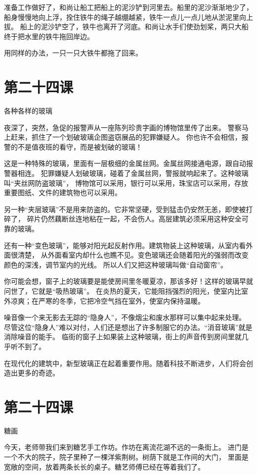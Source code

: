 \documentclass[12pt,UTF8]{ctexbook}
\begin{document}
准备工作做好了，和尚让船工把船上的泥沙铲到河里去。船里的泥沙渐渐地少了，
船身慢慢地向上浮，拴住铁牛的绳子越绷越紧，铁牛一点儿一点儿地从淤泥里向上拔。
船上的泥沙铲空了，铁牛也离开了河底。和尚让水手们使劲划桨，两只大船终于把水里的铁牛拖回岸边。

用同样的办法，一只一只大铁牛都拖了回来。

\section{第二十四课}

各种各样的玻璃

夜深了，突然，急促的报警声从一座陈列珍贵字画的博物馆里传了出来。
警察马上赶来，抓住了一个划破玻璃企图盗窃展品的犯罪嫌疑人。
你也许不会相信，报警的不是值夜班的看守，而是被划破的玻璃！

这是一种特殊的玻璃，里面有一层极细的金属丝网。金属丝网接通电源，跟自动报警器相连。
犯罪嫌疑人划破玻璃，碰着了金属丝网，警报就响起来了。这种玻璃叫“夹丝网防盗玻璃”，
博物馆可以采用，银行可以采用，珠宝店可以采用，存放重要图纸、文件的建筑物也可以采用。

另一种“夹层玻璃”不是用来防盗的。它非常坚硬，受到猛击仍安然无恙，即使被打碎了，
碎片仍然藕断丝连地粘在一起，不会伤人。高层建筑必须采用这种安全可靠的玻璃。

还有一种“变色玻璃”，能够对阳光起反射作用。建筑物装上这种玻璃，从室内看外面很清楚，
从外面看室内却什么也瞧不见。变色玻璃还会随着阳光的强弱而改变颜色的深浅，调节室内的光线。
所以人们又把这种玻璃叫做“自动窗帘”。

你可能会想，窗子上的玻璃要是能使房间里冬暖夏凉，那该多好！这样的玻璃早就问世了，它就是“吸热玻璃”。
在炎热的夏天，它能阻挡强烈的阳光，使室内比室外凉爽；在严寒的冬季，它把冷空气挡在室外，使室内保持温暖。

噪音像一个来无影去无踪的“隐身人”，不像烟尘和废水那样可以集中起来处理。
尽管这位“隐身人”难以对付，人们还是想出了许多制服它的办法。“消音玻璃”就是消除噪音的能手。
临街的窗子上如果装上这种玻璃，街上的声音传到房间里就几乎听不到了。

在现代化的建筑中，新型玻璃正在起着重要作用。随着科技不断进步，人们将会创造出更多的奇迹。

\section{第二十四课}

糖画

今天，老师带我们来到糖艺手工作坊。作坊在离流花湖不远的一条街上。
进门是一个不大的院子，院子里种了一棵洋紫荆树。树荫下就是工作间的大门，
里面是宽敞的空间，放着两条长长的桌子。糖艺师傅已经在等着我们了。
\end{document}
